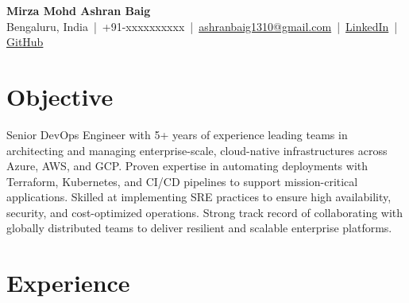 \documentclass[a4paper,10pt]{article}
\begin{document}
\begin{center}
    {\Huge \textbf{Mirza Mohd Ashran Baig}} \\[6pt]
    Bengaluru, India \,|\, +91-xxxxxxxxxx \,|\, 
    \href{mailto:ashranbaig1310@gmail.com}{ashranbaig1310@gmail.com} \,|\, 
    \href{https://www.linkedin.com/in/ashranbaig}{LinkedIn} \,|\, 
    \href{https://github.com/ashranbaig}{GitHub}
\end{center}

\vspace{0.3cm}

\section*{Objective}

Senior DevOps Engineer with 5+ years of experience leading teams in architecting and managing enterprise-scale, cloud-native infrastructures across Azure, AWS, and GCP. Proven expertise in automating deployments with Terraform, Kubernetes, and CI/CD pipelines to support mission-critical applications. Skilled at implementing SRE practices to ensure high availability, security, and cost-optimized operations. Strong track record of collaborating with globally distributed teams to deliver resilient and scalable enterprise platforms.


\section*{Experience}
\end{document}
